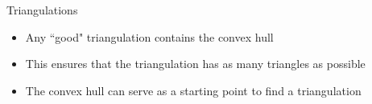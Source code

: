 \begin{frame}{Triangulations}
	\begin{itemize}
		\item Any ``good" triangulation contains the convex hull
		\item This ensures that the triangulation has as many triangles as possible
		\item The convex hull can serve as a starting point to find a triangulation
	\end{itemize}
	
\end{frame}
